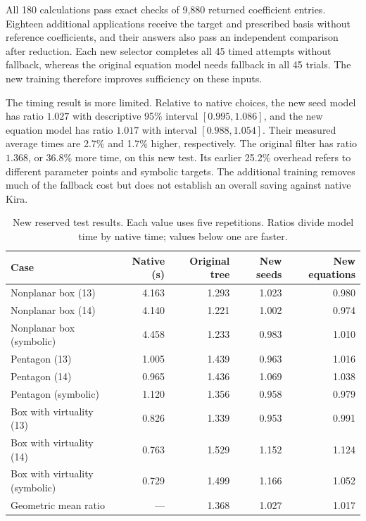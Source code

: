 All 180 calculations pass exact checks of 9,880 returned coefficient entries. Eighteen additional applications receive the target and prescribed basis without reference coefficients, and their answers also pass an independent comparison after reduction. Each new selector completes all 45 timed attempts without fallback, whereas the original equation model needs fallback in all 45 trials. The new training therefore improves sufficiency on these inputs.

The timing result is more limited. Relative to native choices, the new seed model has ratio $1.027$ with descriptive 95\% interval $[0.995,1.086]$, and the new equation model has ratio $1.017$ with interval $[0.988,1.054]$. Their measured average times are 2.7\% and 1.7\% higher, respectively. The original filter has ratio $1.368$, or 36.8\% more time, on this new test. Its earlier 25.2\% overhead refers to different parameter points and symbolic targets. The additional training removes much of the fallback cost but does not establish an overall saving against native Kira.

\begin{table}[!htbp]
\centering\small
\caption{New reserved test results. Each value uses five repetitions. Ratios divide model time by native time; values below one are faster.}
\label{history:tab:scattering-time}
\begin{tabular}{@{}lrrrr@{}}\toprule
Case & Native (s) & Original tree & New seeds & New equations\\\midrule
Nonplanar box (13) & 4.163 & 1.293 & 1.023 & 0.980 \\
Nonplanar box (14) & 4.140 & 1.221 & 1.002 & 0.974 \\
Nonplanar box (symbolic) & 4.458 & 1.233 & 0.983 & 1.010 \\
Pentagon (13) & 1.005 & 1.439 & 0.963 & 1.016 \\
Pentagon (14) & 0.965 & 1.436 & 1.069 & 1.038 \\
Pentagon (symbolic) & 1.120 & 1.356 & 0.958 & 0.979 \\
Box with virtuality (13) & 0.826 & 1.339 & 0.953 & 0.991 \\
Box with virtuality (14) & 0.763 & 1.529 & 1.152 & 1.124 \\
Box with virtuality (symbolic) & 0.729 & 1.499 & 1.166 & 1.052 \\
\midrule
Geometric mean ratio & --- & 1.368 & 1.027 & 1.017\\\bottomrule
\end{tabular}
\end{table}

